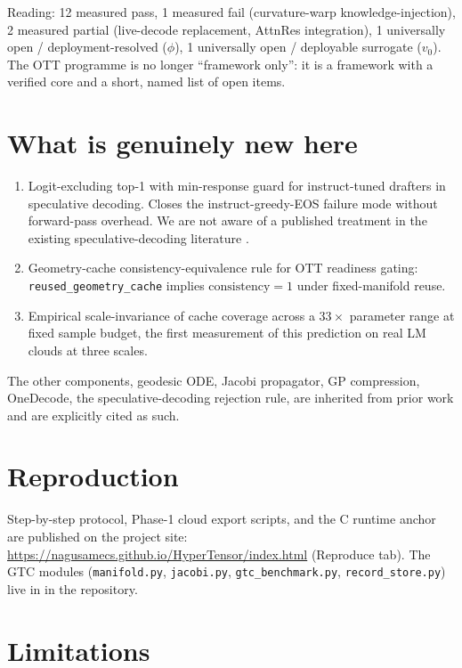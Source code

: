 \documentclass[11pt]{article}
\begin{document}
Reading: 12 measured pass, 1 measured fail (curvature-warp
knowledge-injection), 2 measured partial (live-decode replacement, AttnRes
integration), 1 universally open / deployment-resolved ($\phi$), 1
universally open / deployable surrogate ($v_0$). The OTT programme is no
longer ``framework only'': it is a framework with a verified core and a
short, named list of open items.

\section{What is genuinely new here}

\begin{enumerate}
  \item Logit-excluding top-1 with min-response guard for
        instruct-tuned drafters in speculative decoding. Closes the
        instruct-greedy-EOS failure mode without forward-pass overhead. We are
        not aware of a published treatment in the existing speculative-decoding
        literature \cite{leviathan2023fast,chen2023accelerating,cai2024medusa,li2024eagle}.
  \item Geometry-cache consistency-equivalence rule for OTT readiness
        gating: \texttt{reused\_geometry\_cache} implies $\text{consistency}=1$
        under fixed-manifold reuse.
  \item Empirical scale-invariance of cache coverage across a
        $33\times$ parameter range at fixed sample budget, the first
        measurement of this prediction on real LM clouds at three scales.
\end{enumerate}

The other components, geodesic ODE, Jacobi propagator, GP compression,
OneDecode, the speculative-decoding rejection rule, are inherited from
prior work and are explicitly cited as such.

\section{Reproduction}
Step-by-step protocol, Phase-1 cloud export scripts, and the C runtime
anchor are published on the project site:
\url{https://nagusamecs.github.io/HyperTensor/index.html} (Reproduce tab).
The GTC modules (\texttt{manifold.py}, \texttt{jacobi.py},
\texttt{gtc\_benchmark.py}, \texttt{record\_store.py}) live in
 in the repository.

\section{Limitations}
\end{document}
